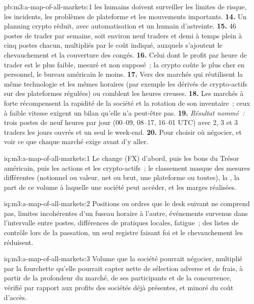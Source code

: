 \begin{solution}{pb:m3:a-map-of-all-markets:1}
les humains doivent surveiller les limites de risque, les incidents, les problèmes de plateforme et les mouvements importants. \textbf{14.} Un planning crypto réduit, avec automatisation et un humain d'astreinte.
\textbf{15.} 46 postes de trader par semaine, soit environ neuf traders et demi à temps plein à cinq postes chacun, multipliés par le coût indiqué, auxquels s'ajoutent le chevauchement et
la couverture des congés. \textbf{16.} Celui dont le profit par heure de trader est le plus faible, mesuré et non supposé~; la crypto coûte le plus cher en personnel, le bureau américain le moins.
\textbf{17.} Vers des marchés qui réutilisent la même technologie et les mêmes horaires (par exemple les dérivés de crypto-actifs sur des plateformes régulées) ou comblent les heures creuses.
\textbf{18.} Les marchés à forte  récompensent la rapidité de la société et la rotation de son inventaire~; ceux à faible vitesse exigent un bilan qu'elle n'a peut-être pas.
\textbf{19.} \emph{Résultat nommé~:} trois postes de neuf heures par jour (00--09, 08--17, 16--01 UTC) avec 2, 3 et 3 traders les jours ouvrés et un seul le week-end.
\textbf{20.} Pour choisir où négocier, et voir ce que chaque marché exige avant d'y aller.
\end{solution}

\begin{solution}{iq:m3:a-map-of-all-markets:1}
Le change (FX) d'abord, puis les bons du Trésor américain, puis les actions et les crypto-actifs~; le classement masque des mesures différentes (notionnel ou valeur, net ou brut, une plateforme ou toutes),
la , la part de ce volume à laquelle une société peut accéder, et les marges réalisées.
\end{solution}

\begin{solution}{iq:m3:a-map-of-all-markets:2}
Positions ou ordres que le desk suivant ne comprend pas, limites incohérentes d'un fuseau horaire à l'autre, événements survenus dans l'intervalle entre postes, différences de pratiques
locales, fatigue~; des listes de contrôle lors de la passation, un seul registre faisant foi et le chevauchement les réduisent.
\end{solution}

\begin{solution}{iq:m3:a-map-of-all-markets:3}
Volume que la société pourrait négocier, multiplié par la fourchette qu'elle pourrait capter nette de sélection adverse et de frais, à partir de la profondeur du marché, de ses participants et de la concurrence,
vérifié par rapport aux profits des sociétés déjà présentes, et minoré du coût d'accès.
\end{solution}

